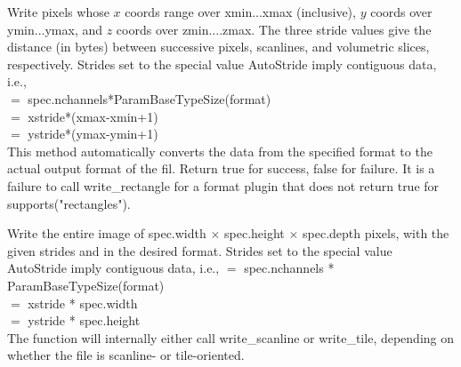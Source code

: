 \apiend


Write pixels whose $x$ coords range over {\kw xmin}...{\kw xmax} (inclusive), $y$
coords over {\kw ymin}...{\kw ymax}, and $z$ coords over {\kw
  zmin}....{\kw zmax}.  The
three stride values give the distance (in bytes) between
successive pixels, scanlines, and volumetric slices,
respectively.  Strides set to the special value {\kw AutoStride}
imply contiguous data, i.e.,\\
 $=$ {\kw spec.nchannels*ParamBaseTypeSize(format)} \\
 $=$ {\kw xstride*(xmax-xmin+1)} \\
 $=$ {\kw ystride*(ymax-ymin+1)}\\
This method automatically converts the data from the specified 
{\kw format} to the actual output format of the fil.  Return {\kw true}
for success, {\kw false} for failure.  It is a failure to call 
{\kw write_rectangle} for a format plugin that does not return true for
{\kw supports("rectangles")}.

\apiend


Write the entire image of {\kw spec.width} $\times$ {\kw spec.height}
$\times$ {\kw spec.depth}
pixels, with the given strides and in the desired format.
Strides set to the special value {\kw AutoStride} imply contiguous data, i.e.,
 $=$ {\kw spec.nchannels * ParamBaseTypeSize(format)} \\
 $=$ {\kw xstride * spec.width} \\
 $=$ {\kw ystride * spec.height}\\
The function will internally either call {\kw write_scanline} or 
{\kw write_tile}, depending on whether the file is scanline- or
tile-oriented.

